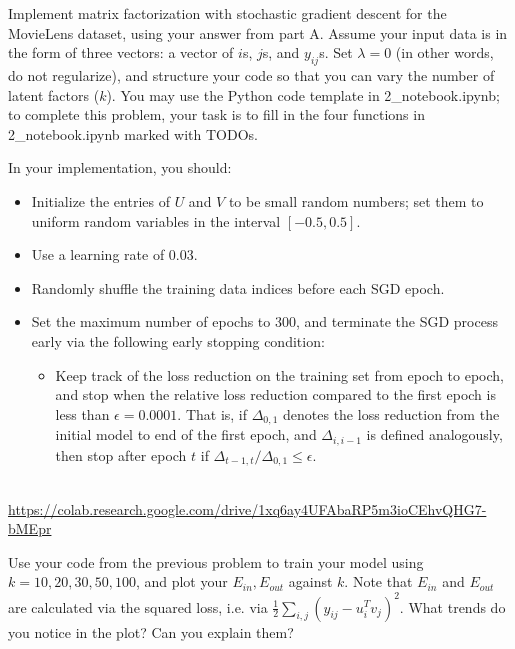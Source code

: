 Implement matrix factorization with stochastic gradient descent for the MovieLens dataset, using your answer from part A. Assume your input data is in the form of three vectors: a vector of $i$s, $j$s, and $y_{ij}$s. Set $\lambda = 0$ (in other words, do not regularize), and structure your code so that you can vary the number of latent factors ($k$). You may use the Python code template in 2_notebook.ipynb; to complete this problem, your task is to fill in the four functions in 2_notebook.ipynb marked with TODOs.

In your implementation, you should:

\begin{itemize}
\item Initialize the entries of $U$ and $V$ to be small random numbers; set them to uniform random variables in the interval $[-0.5, 0.5]$.
\item Use a learning rate of 0.03.
\item Randomly shuffle the training data indices before each SGD epoch.
\item Set the maximum number of epochs to 300, and terminate the SGD process early via the following early stopping condition:
\begin{itemize}
\item Keep track of the loss reduction on the training set from epoch to epoch, and stop when the relative loss reduction compared to the first epoch is less than $\epsilon = 0.0001$.  That is, if $\Delta_{0,1}$ denotes the loss reduction from the initial model to end of the first epoch, and $\Delta_{i, i-1}$ is defined analogously, then stop after epoch $t$ if $\Delta_{t-1,t} / \Delta_{0,1} \leq \epsilon$.
\end{itemize}
\end{itemize}
\begin{solution}
	\\ \url{https://colab.research.google.com/drive/1xq6ay4UFAbaRP5m3ioCEhvQHG7-bMEpr}
\end{solution}

\problem[5]Use your code from the previous problem to train your model using $k=10, 20, 30, 50, 100$, and plot your $E_{in}, E_{out}$ against $k$. Note that $E_{in}$ and $E_{out}$ are calculated via the squared loss, i.e. via $\frac{1}{2}\sum_{i,j} \left( y_{ij} - u_i^Tv_j\right)^2$. What trends do you notice in the plot? Can you explain them?

